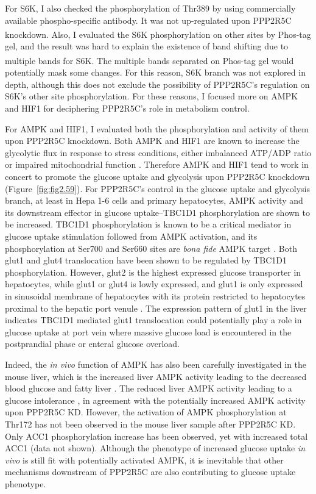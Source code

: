 For S6K, I also checked the phosphorylation of Thr389 by using commercially available phospho-specific antibody. It was not up-regulated upon PPP2R5C knockdown. Also, I evaluated the S6K phosphorylation on other sites  by Phos-tag\textsuperscript{\textregistered} gel, and the result was hard to explain the existence of band shifting due to multiple bands for S6K. The multiple bands separated on Phos-tag\textsuperscript{\textregistered} gel would potentially mask some changes. For this reason, S6K branch was not explored in depth, although this does not exclude the possibility of PPP2R5C's regulation on S6K's other site phosphorylation. For these reasons, I focused more on AMPK and HIF1\textalpha{} for deciphering PPP2R5C's role in metabolism control.

For AMPK and HIF1\textalpha{}, I evaluated both the phosphorylation and activity of them upon PPP2R5C knockdown. Both AMPK and HIF1\textalpha{} are known to increase the glycolytic flux in response to stress conditions, either imbalanced ATP/ADP ratio or impaired mitochondrial function \cite{hardie_ampk:_2012,denko_hypoxia_2008}. Therefore AMPK and HIF1\textalpha{} tend to work in concert to promote the glucose uptake and glycolysis upon PPP2R5C knockdown (Figure~\ref{fig:fig2.59}). For PPP2R5C's control in the glucose uptake and glycolysis branch, at least in Hepa 1-6 cells and primary hepatocytes, AMPK activity and its downstream effector in glucose uptake--TBC1D1 phosphorylation are shown to be increased. TBC1D1 phosphorylation is known to be a critical mediator in glucose uptake stimulation followed from AMPK activation, and its phosphorylation at Ser700 and Ser660 sites are \textit{bona fide} AMPK target \cite{vichaiwong_contraction_2010}. Both glut1 and glut4 translocation have been shown to be regulated by TBC1D1 phosphorylation. However, glut2 is the highest expressed glucose transporter in hepatocytes, while glut1 or glut4 is lowly expressed, and glut1 is only expressed in sinusoidal membrane of hepatocytes with its protein restricted to hepatocytes proximal to the hepatic port venule \cite{karim_hepatic_2012}. The expression pattern of glut1 in the liver indicates TBC1D1 mediated glut1 translocation could potentially play a role in glucose uptake at port vein where massive glucose load is encountered in the postprandial phase or enteral glucose overload. 

Indeed, the \textit{in vivo} function of AMPK has also been carefully investigated in the mouse liver, which is the increased liver AMPK activity leading to the decreased blood glucose and fatty liver \cite{foretz_short-term_2005}. The reduced liver AMPK activity leading to a glucose intolerance \cite{andreelli_liver_2006}, in agreement with the potentially increased AMPK activity upon PPP2R5C KD. However, the activation of AMPK phosphorylation at Thr172 has not been observed in the mouse liver sample after PPP2R5C KD. Only ACC1 phosphorylation increase has been observed, yet with increased total ACC1 (data not shown). Although the phenotype of increased glucose uptake \textit{in vivo} is still fit with potentially activated AMPK, it is inevitable that other mechanisms downstream of PPP2R5C are also contributing to glucose uptake phenotype.

